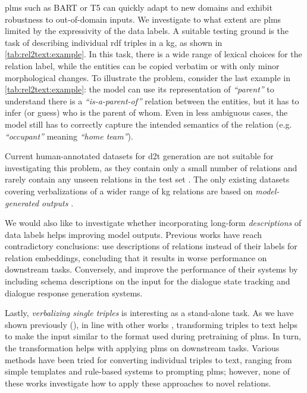 \acp{plm} such as BART \cite{lewisBARTDenoisingSequencetoSequence2019} or T5 \cite{raffelExploringLimitsTransfer2019} can quickly adapt to new domains and exhibit robustness to out-of-domain inputs. We investigate to what extent are \acp{plm} limited by the expressivity of the data labels. A suitable testing ground is the task of describing individual \acs{rdf} triples in a \ac{kg}, as shown in \autoref{tab:rel2text:example}. In this task, there is a wide range of lexical choices for the relation label, while the entities can be copied verbatim or with only minor morphological changes. To illustrate the problem, consider the last example in \autoref{tab:rel2text:example}: the model can use its representation of \emph{``parent''} to understand there is a \emph{``is-a-parent-of''} relation between the entities, but it has to infer (or guess) who is the parent of whom. Even in less ambiguous cases, the model still has to correctly capture the intended semantics of the relation (e.g. \emph{``occupant''} meaning \emph{``home team''}).


Current human-annotated datasets for \ac{d2t} generation are not suitable for investigating this problem, as they contain only a small number of relations and rarely contain any unseen relations in the test set \cite{mille2021automatic}. The only existing datasets covering verbalizations of a wider range of \ac{kg} relations are based on \emph{model-generated outputs} \cite{agarwalKnowledgeGraphBased2021,amaral2022wdv}.

We would also like to investigate whether incorporating long-form \emph{descriptions} of data labels helps improving model outputs. Previous works have reach contradictory conclusions: \citet{wang2021kepler} use descriptions of relations instead of their labels for relation embeddings, concluding that it results in worse performance on downstream tasks. Conversely, \citet{kale-rastogi-2020-template} and \citet{lee2021dialogue} improve the performance of their systems by including schema descriptions on the input for the dialogue state tracking and dialogue response generation systems.

Lastly, \emph{verbalizing single triples} is interesting as a stand-alone task. As we have shown previously (), in line with other works \cite{xiangASDOTAnyShotDatatoText2022,kale-rastogi-2020-template,gupta2020infotabs,neeraja2021incorporating}, transforming triples to text helps to make the input similar to the format used during pretraining of \acp{plm}. In turn, the transformation helps with applying \acp{plm} on downstream tasks. Various methods have been tried for converting individual triples to text, ranging from simple templates and rule-based systems to prompting \acp{plm}; however, none of these works investigate how to apply these approaches to novel relations.


